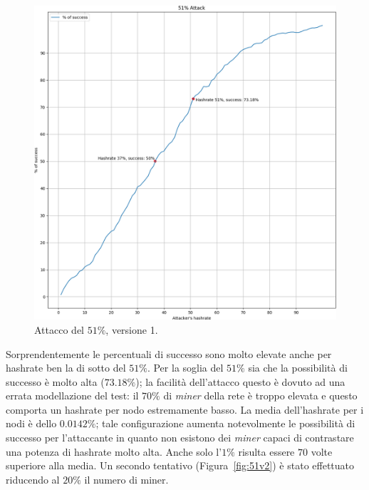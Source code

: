 \begin{figure}[H]
    \centering
    \includegraphics[width=\textwidth]{./images/51-v1.png}
    \caption{Attacco del $51\%$, versione 1.}
    \label{fig:51v1}
\end{figure}
Sorprendentemente le percentuali di successo sono molto elevate anche per hashrate ben la di sotto del $51\%$. Per la soglia del $51\%$ sia che la possibilità di successo è molto alta ($73.18\%$); la facilità dell'attacco questo è dovuto ad una errata modellazione del test: il $70\%$ di \textit{miner} della rete è troppo elevata e questo comporta un hashrate per nodo estremamente basso. La media dell'hashrate per i nodi è dello $0.0142\%$; tale configurazione aumenta notevolmente le possibilità di successo per l'attaccante in quanto non esistono dei \textit{miner} capaci di contrastare una potenza di hashrate molto alta. Anche solo l'$1\%$ risulta essere $70$ volte superiore alla media.\newline
Un secondo tentativo (Figura~\ref{fig:51v2}) è stato effettuato riducendo al $20\%$ il numero di miner.
